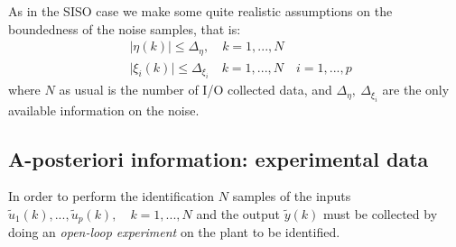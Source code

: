 As in the SISO case we make some quite realistic assumptions on the boundedness of the noise samples, that is:
\begin{equation}
    \begin{aligned}
        &\vert \eta(k) \vert \le \Delta_\eta, \quad k=1,...,N\\
        &\vert \xi_i(k) \vert \le \Delta_{\xi_i} \quad k=1,...,N \quad i=1,...,p
    \end{aligned}
\end{equation}
where $N$ as usual is the number of I/O collected data, and $\Delta_{\eta}, \ \Delta_{\xi_i}$ are the only available information on the noise.

\subsection{A-posteriori information: experimental data}
In order to perform the identification $N$ samples of the inputs $\tilde{u}_1(k), ..., \tilde{u}_p(k), \quad k=1,...,N$ and the output $\tilde{y}(k)$ must be collected by doing an \textit{open-loop experiment} on the plant to be identified.

